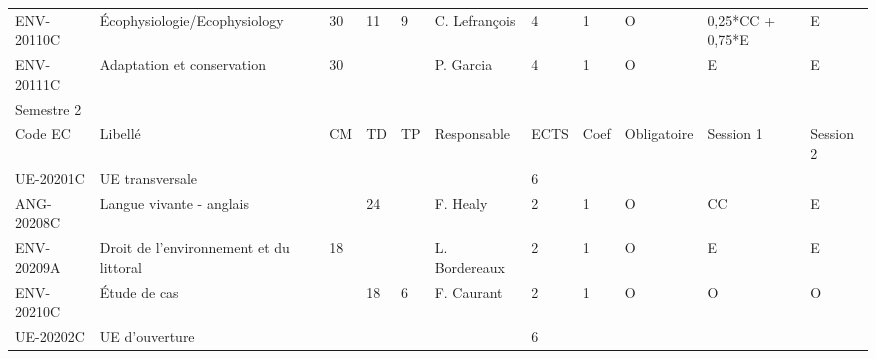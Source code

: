\documentclass[a4paper,11pt]{article}
\begin{document}
{{\begin{tabular}{lllllllllll}
ENV-20110C                         & \cellcolor[HTML]{FD6864}Écophysiologie/Ecophysiology                           & 30 & 11                         & 9  & C. Lefrançois                      & 4    & 1    & O           & 0,25*CC + 0,75*E & E         \\
ENV-20111C                         & Adaptation et conservation                                                     & 30 &                            &    & P. Garcia                          & 4    & 1    & O           & E                & E         \\
\rowcolor[HTML]{9B9B9B} 
Semestre 2                         &                                                                                &    &                            &    &                                    &      &      &             &                  &           \\
\rowcolor[HTML]{C0C0C0} 
Code EC                            & Libellé                                                                        & CM & TD                         & TP & Responsable                        & ECTS & Coef & Obligatoire & Session 1        & Session 2 \\
\rowcolor[HTML]{EFEFEF} 
UE-20201C                          & UE transversale                                                                &    &                            &    &                                    & 6    &      &             &                  &           \\
ANG-20208C                         & Langue vivante - anglais                                                       &    & 24                         &    & F. Healy                           & 2    & 1    & O           & CC               & E         \\
\cellcolor[HTML]{FD6864}ENV-20209A & Droit de l'environnement et du littoral                                        & 18 &                            &    & L. Bordereaux                      & 2    & 1    & O           & E                & E         \\
ENV-20210C                         & \cellcolor[HTML]{FD6864}Étude de cas                                           &    & 18                         & 6  & \cellcolor[HTML]{FD6864}F. Caurant & 2    & 1    & O           & O                & O         \\
\rowcolor[HTML]{EFEFEF} 
UE-20202C                          & UE d'ouverture                                                                 &    &                            &    &                                    & 6    &      &             &                  &           \\

\end{tabular}}}
\end{document}

